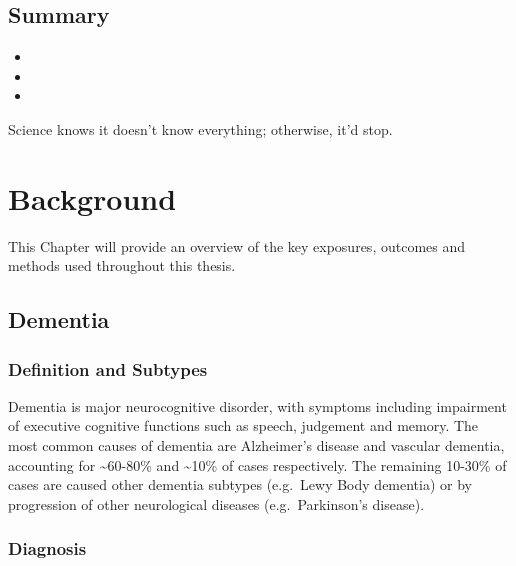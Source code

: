 \documentclass[a4paper, twoside]{templates/ociamthesis}
\begin{document}
\hypertarget{summary}{%
\section{Summary}\label{summary}}

\begin{itemize}
\item
\item
\item
\end{itemize}

\begin{savequote}
Science knows it doesn't know everything; otherwise, it'd stop.
\end{savequote}



\hypertarget{background-heading}{%
\chapter{Background}\label{background-heading}}

\minitoc 

This Chapter will provide an overview of the key exposures, outcomes and methods used throughout this thesis.

\hypertarget{dementia}{%
\section{Dementia}\label{dementia}}

\hypertarget{definition-and-subtypes}{%
\subsection{Definition and Subtypes}\label{definition-and-subtypes}}

Dementia is major neurocognitive disorder, with symptoms including impairment of executive cognitive functions such as speech, judgement and memory. The most common causes of dementia are Alzheimer's disease and vascular dementia, accounting for \textasciitilde60-80\% and \textasciitilde10\% of cases respectively. The remaining 10-30\% of cases are caused other dementia subtypes (e.g.~Lewy Body dementia) or by progression of other neurological diseases (e.g.~Parkinson's disease).

\hypertarget{diagnosis}{%
\subsection{Diagnosis}\label{diagnosis}}
\end{document}
